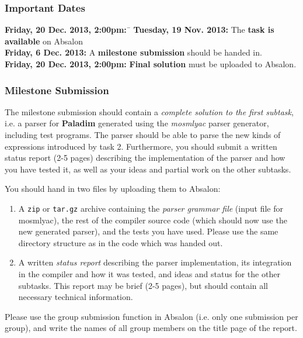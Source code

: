 \documentclass[12pt,a4paper]{article}
\newcommand{\paladim}{\textbf{Paladim}\xspace}
\begin{document}
\subsubsection{Important Dates}
\begin{tabbing}
\textbf{Friday, 20 Dec. 2013, 2:00pm:}~\= \kill
\textbf{Tuesday, 19 Nov. 2013:}\> The \textbf{task is available} on Absalon\\
\textbf{Friday, 6 Dec. 2013:}\>
A \textbf{milestone submission} should be handed in.\\
\textbf{Friday, 20 Dec. 2013, 2:00pm:}\>
\textbf{Final solution} must be uploaded to Absalon.\\

\end{tabbing}

\subsubsection{Milestone Submission}

The milestone submission should contain a \emph{complete solution to the first
subtask}, i.e. a parser for \paladim generated using the \emph{mosmlyac}
parser generator, including test programs. The parser should be able to parse
the new kinds of expressions introduced by task 2.
Furthermore, you should submit a written status report (2-5 pages) describing
the implementation of the parser and how you have tested it, as well as your
ideas and partial work on the other subtasks.

You should hand in two files by uploading them to Absalon:
\begin{enumerate}
\item A \texttt{zip} or \texttt{tar.gz} archive containing
    the \emph{parser grammar file} (input file for mosmlyac),
    the rest of the compiler source code (which should now use the new
    generated parser),
    and the tests you have used.
Please use the same directory structure as in the code which was handed out.

\item A written \emph{status report} describing the parser implementation, its
    integration in the compiler and how it was tested, and ideas and status
    for the other subtasks. This report may be brief (2-5 pages), but should
    contain all necessary technical information.
\end{enumerate}
Please use the group submission function in Absalon (i.e. only one submission
per group), and write the names of all group members on the title page of the
report.
\end{document}
